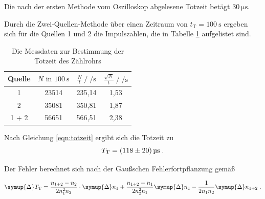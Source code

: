 Die nach der ersten Methode vom Oszilloskop abgelesene Totzeit betägt 
$\SI{30}{\micro\second}$. 

Durch die Zwei-Quellen-Methode über einen Zeitraum von
$t_\text{T} = \SI{100}{\second}$ ergeben sich für die Quellen 1 und 2
die Impulszahlen, die in Tabelle \ref{tab:mess2} aufgelistet sind.

\begin{table}
  \centering
  \caption{Die Messdaten zur Bestimmung der Totzeit des Zählrohrs}
\label{tab:mess2}
  \begin{tabular}{c c c c}
  \toprule
  Quelle & $N \text{ in } \SI{100}{\second}$ & 
  $\frac{N}{t} \;/\; \si{\per\second}$
  & $\frac{\sqrt{N}}{t} \;/\; \si{\per\second}$\\
  \midrule
  1     & 23514 & 235,14 & 1,53 \\
  2     & 35081 & 350,81 & 1,87 \\
  1 + 2 & 56651 & 566,51 & 2,38 \\
  \bottomrule
  \end{tabular}
  \end{table}

  Nach Gleichung \eqref{eqn:totzeit} ergibt sich die Totzeit zu 
  \begin{equation*}
   T_\text{T} = \SI{118 +- 20}{\micro\second} \;.
  \end{equation*}

  Der Fehler berechnet sich nach der Gaußschen Fehlerfortpflanzung gemäß

  \begin{equation}
    \symup{\Delta} T_\text{T} = \frac{n_{1+2} - n_2}{2 n_1^2 n_2} \cdot \symup{\Delta} n_1
    + \frac{n_{1+2} - n_1}{2 n_2^2 n_1} \symup{\Delta} n_1 -
    \frac{1}{2 n_1 n_2} \symup{\Delta} n_{1+2} \; .
  \end{equation}




